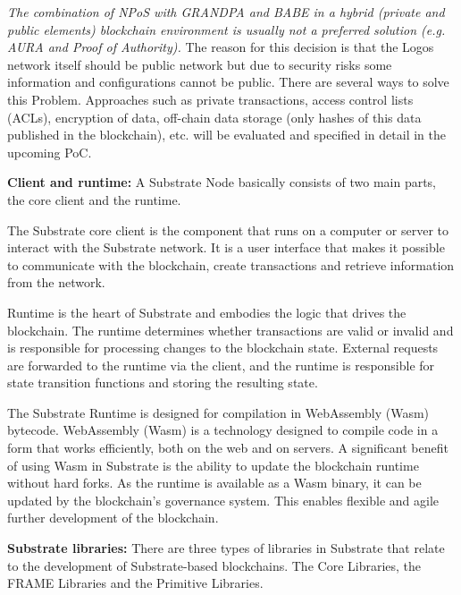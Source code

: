 \documentclass[]{article}
\begin{document}
\textit{The combination of NPoS with GRANDPA and BABE in a hybrid (private and public elements) blockchain environment is usually not a preferred solution (e.g. AURA and Proof of Authority).}
\newline
The reason for this decision is that the Logos network itself should be public network but due to security risks some information and configurations cannot be public.
There are several ways to solve this Problem. 
Approaches such as private transactions, access control lists (ACLs), encryption of data, off-chain data storage (only hashes of this data published in the blockchain), etc. will be evaluated and specified in detail in the upcoming PoC.
\newline

\textbf{Client and runtime:}
A Substrate Node basically consists of two main parts, the core client and the runtime.

The Substrate core client is the component that runs on a computer or server to interact with the Substrate network. 
It is a user interface that makes it possible to communicate with the blockchain, create transactions and retrieve information from the network.

Runtime is the heart of Substrate and embodies the logic that drives the blockchain.
The runtime determines whether transactions are valid or invalid and is responsible for processing changes to the blockchain state. 
External requests are forwarded to the runtime via the client, and the runtime is responsible for state transition functions and storing the resulting state.

The Substrate Runtime is designed for compilation in WebAssembly (Wasm) bytecode.
WebAssembly (Wasm) \cite{Webass} is a technology designed to compile code in a form that works efficiently, both on the web and on servers.
A significant benefit of using Wasm in Substrate is the ability to update the blockchain runtime without hard forks. 
As the runtime is available as a Wasm binary, it can be updated by the blockchain's governance system. 
This enables flexible and agile further development of the blockchain.
\newline

\textbf{Substrate libraries:}
There are three types of libraries in Substrate that relate to the development of Substrate-based blockchains.
The Core Libraries, the FRAME Libraries and the Primitive Libraries.  
\end{document}
